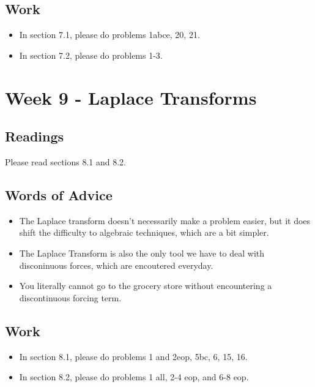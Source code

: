 	\subsection{Work}
		\begin{itemize}
			\item In section 7.1, please do problems 1abce, 20, 21.
			\item In section 7.2, please do problems 1-3.
		\end{itemize}

	\clearpage



	\section{Week 9 - Laplace Transforms}

	\subsection{Readings}
		Please read sections 8.1 and 8.2.

	\subsection{Words of Advice}
		\begin{itemize}
			\item The Laplace transform doesn't necessarily make a problem easier, but it does shift the difficulty to algebraic techniques, which are a bit simpler.
			\item The Laplace Transform is also the only tool we have to deal with disconinuous forces, which are encoutered everyday.
			\item You literally cannot go to the grocery store without encountering a discontinuous forcing term.
		\end{itemize}

	\subsection{Work}
		\begin{itemize}
			\item In section 8.1, please do problems 1 and 2eop, 5bc, 6, 15, 16.
			\item In section 8.2, please do problems 1 all, 2-4 eop, and 6-8 eop.
		\end{itemize}

